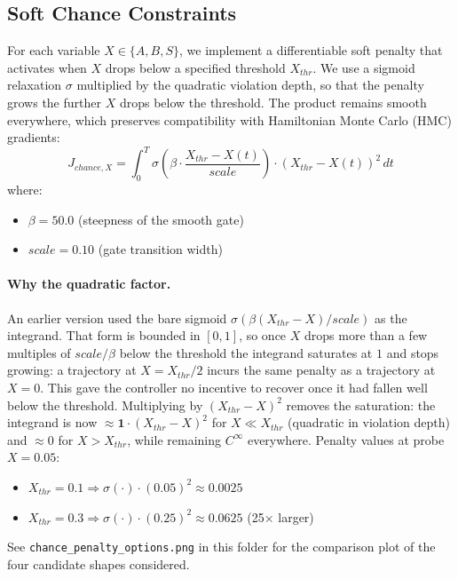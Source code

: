 \documentclass[11pt,a4paper]{article}
\begin{document}
\subsection{Soft Chance Constraints}
For each variable $X \in \{A, B, S\}$, we implement a differentiable soft penalty that activates when $X$ drops below a specified threshold $X_{thr}$. We use a sigmoid relaxation $\sigma$ multiplied by the quadratic violation depth, so that the penalty grows the further $X$ drops below the threshold. The product remains smooth everywhere, which preserves compatibility with Hamiltonian Monte Carlo (HMC) gradients:
\begin{equation}
J_{chance, X} = \int_0^T \sigma\left( \beta \cdot \frac{X_{thr} - X(t)}{scale} \right) \cdot \left(X_{thr} - X(t)\right)^2 \, dt
\end{equation}
where:
\begin{itemize}
    \item $\beta = 50.0$ (steepness of the smooth gate)
    \item $scale = 0.10$ (gate transition width)
\end{itemize}

\paragraph{Why the quadratic factor.} An earlier version used the bare sigmoid $\sigma(\beta(X_{thr}-X)/scale)$ as the integrand. That form is bounded in $[0,1]$, so once $X$ drops more than a few multiples of $scale/\beta$ below the threshold the integrand saturates at $1$ and stops growing: a trajectory at $X = X_{thr}/2$ incurs the same penalty as a trajectory at $X = 0$. This gave the controller no incentive to recover once it had fallen well below the threshold. Multiplying by $(X_{thr}-X)^2$ removes the saturation: the integrand is now $\approx \mathbf{1} \cdot (X_{thr}-X)^2$ for $X \ll X_{thr}$ (quadratic in violation depth) and $\approx 0$ for $X > X_{thr}$, while remaining $C^\infty$ everywhere. Penalty values at probe $X = 0.05$:
\begin{itemize}
    \item $X_{thr}=0.1 \Rightarrow \sigma(\cdot) \cdot (0.05)^2 \approx 0.0025$
    \item $X_{thr}=0.3 \Rightarrow \sigma(\cdot) \cdot (0.25)^2 \approx 0.0625$ (25$\times$ larger)
\end{itemize}
See \texttt{chance\_penalty\_options.png} in this folder for the comparison plot of the four candidate shapes considered.
\end{document}
